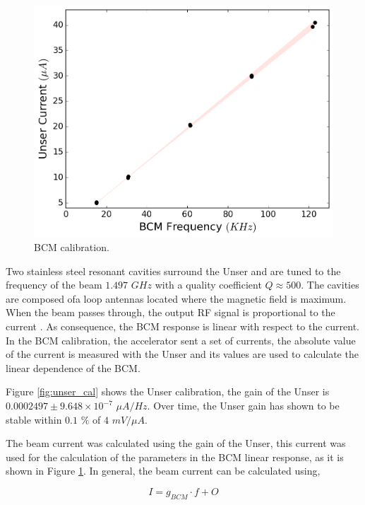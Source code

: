 \documentclass[final,5p,times,twocolumn]{elsarticle}
\begin{document}
\begin{figure}[!h]
      \centering
    \includegraphics[width=\linewidth]{images/dnew_calibration.pdf}
    \caption{BCM calibration.}
    \label{fig:dnew_cal}
\end{figure}

Two stainless steel resonant cavities surround the Unser and are tuned to the frequency of the beam $1.497$ $GHz$ with a quality coefficient $Q \approx 500$.    The cavities are composed ofa  loop antennas located where the magnetic field is maximum. When the beam passes through, the output RF signal is proportional to the current \cite{denard}. As consequence, the BCM response is linear with respect to the current. In the BCM calibration, the accelerator sent a set of currents, the absolute value of the current is measured with the Unser and its values are used to calculate the linear dependence of the BCM.


Figure \ref{fig:unser_cal} shows the Unser calibration, the gain of the Unser is $0.0002497 \pm 9.648 \times 10^{-7} $ $\mu A/Hz$. Over time, the Unser gain has shown to be stable within $0.1$ $\%$ of $4$ $mV/\mu A$. 

The beam current was calculated using the gain of the Unser, this current was used for the calculation of the parameters in the BCM linear response, as it is shown in Figure \ref{fig:dnew_cal}. In general, the beam current can be calculated using,

\begin{equation}
I = g_{BCM}\cdot f+O
\label{eq:current_calc}
\end{equation}
\end{document}
